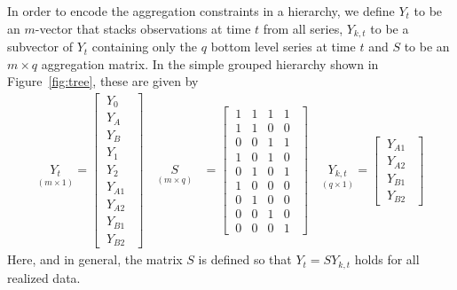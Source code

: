 \documentclass[a4paper,fleqn,11pt]{article}
\begin{document}
In order to encode the aggregation constraints in a hierarchy, we define $Y_t$ to be an $m$-vector that stacks observations at time $t$ from all series, $Y_{k,t}$ to be a subvector of $Y_t$ containing only the $q$ bottom level series at time $t$ and $S$ to be an $m\times q$  aggregation matrix.  In the simple grouped hierarchy shown in Figure~\ref{fig:tree}, these are given by
\begin{align*}
	\underset{(m\times 1)}{Y_t} = \begin{bmatrix}
		\ Y_0\ \ \\
		\ Y_A\ \ \\
		\ Y_B\ \ \\
		\ Y_1\ \ \\
		\ Y_2\ \ \\
		\ Y_{A1}\ \ \\
		\ Y_{A2}\ \ \\
		\ Y_{B1}\ \ \\
		\ Y_{B2}\ \ 
	\end{bmatrix} \quad \underset{(m\times q)}{S} &=
	\begin{bmatrix}
		\ 1 & 1 & 1 & 1 \ \ \\
		\ 1 & 1 & 0 & 0 \ \ \\
		\ 0 & 0  & 1 & 1\ \ \\
		\ 1 & 0 & 1 & 0 \ \ \\
		\ 0 & 1 & 0 & 1\ \ \\
		\ 1 & 0 & 0 & 0 \ \ \\
		\ 0 & 1 & 0 & 0 \ \ \\
		\ 0 & 0 & 1 & 0 \ \ \\
		\ 0 & 0 & 0 & 1\ \ 
	\end{bmatrix} \quad \underset{(q\times 1)}{Y_{k,t}} = \begin{bmatrix}
		\ Y_{A1}\ \ \\
		\ Y_{A2}\ \ \\
		\ Y_{B1}\ \ \\
		\ Y_{B2}\ \ 
	\end{bmatrix} 
\end{align*}
Here, and in general, the matrix $S$ is defined so that $Y_t = S Y_{k,t}$ holds for all realized data. 
	
\end{document}
